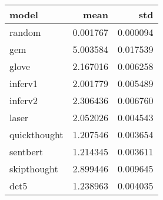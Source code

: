 \begin{tabular}{lrr}
\toprule
        model &      mean &       std \\
\midrule
       random &  0.001767 &  0.000094 \\
          gem &  5.003584 &  0.017539 \\
        glove &  2.167016 &  0.006258 \\
      inferv1 &  2.001779 &  0.005489 \\
      inferv2 &  2.306436 &  0.006760 \\
        laser &  2.052026 &  0.004543 \\
 quickthought &  1.207546 &  0.003654 \\
     sentbert &  1.214345 &  0.003611 \\
  skipthought &  2.899446 &  0.009645 \\
         dct5 &  1.238963 &  0.004035 \\
\bottomrule
\end{tabular}
